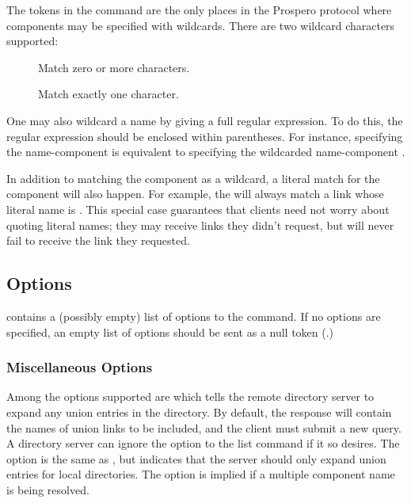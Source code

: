 The  tokens in the  command are the
only places in the Prospero protocol where components may be specified
with wildcards.    There are two wildcard characters supported:
\begin{description}
\item[\lit{*}] Match zero or more characters.   
\item[] Match exactly one character.  
\end{description}

One may also wildcard a name by giving a full regular expression.  To
do this, the regular expression should be enclosed within parentheses.
For instance, specifying the name-component  is equivalent to specifying the
wildcarded name-component .

In addition to matching the component as a wildcard, a literal match
for the component will also happen.  For example, the 
 will always match a link whose literal name is
.  This special case guarantees that clients need not
worry about quoting literal names; they may receive links they didn't
request, but will never fail to receive the link they requested.



\subsection{Options}

 contains a (possibly empty) list of options to the
 command.  If no options are specified, an empty
list of options should be sent as
a null token (.)

\subsubsection{Miscellaneous Options}

Among the options supported are  which tells the remote directory
server to expand any union entries in the directory.  By default, the
response will contain the names of union links to be included, and the
client must submit a new query.  A directory server can ignore the
 option to the list command if it so desires.  The 
option is the same as , but indicates that the server should
only expand union entries for local directories.  The  option
is implied if a multiple component name is being resolved.

